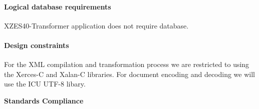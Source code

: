 \paragraph{Logical database requirements}

XZES40-Transformer application does not require database. 

\paragraph{Design constraints}


For the XML compilation and transformation process we are restricted to using the Xerces-C and Xalan-C libraries.
For document encoding and decoding we will use the ICU UTF-8 libary.

\textbf{Standards Compliance}

